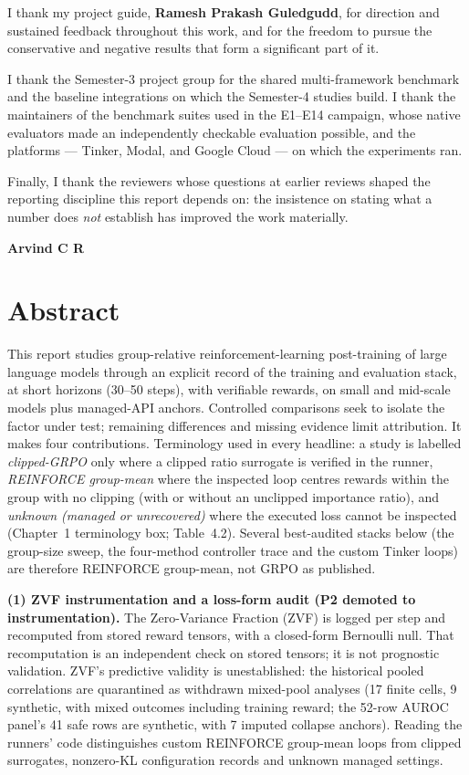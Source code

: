 I thank my project guide, \textbf{Ramesh Prakash Guledgudd}, for direction and
sustained feedback throughout this work, and for the freedom to pursue the
conservative and negative results that form a significant part of it.

I thank the Semester-3 project group for the shared multi-framework benchmark
and the baseline integrations on which the Semester-4 studies build. I thank
the maintainers of the benchmark suites used in the E1--E14 campaign, whose
native evaluators made an independently checkable evaluation possible, and the
platforms --- Tinker, Modal, and Google Cloud --- on which the experiments ran.

Finally, I thank the reviewers whose questions at earlier reviews shaped the
reporting discipline this report depends on: the insistence on stating what a
number does \emph{not} establish has improved the work materially.

\vspace{0.3in}
\noindent\textbf{Arvind C R}

\chapter*{Abstract}
\thispagestyle{plain}

This report studies group-relative reinforcement-learning post-training of
large language models through an explicit record of the training and
evaluation stack, at short horizons (30--50 steps), with verifiable rewards,
on small and mid-scale models plus managed-API anchors. Controlled comparisons seek to isolate the factor under
test; remaining differences and missing evidence limit attribution.
It makes four contributions. Terminology used in every headline: a study is
labelled \emph{clipped-GRPO} only where a clipped ratio surrogate is verified in
the runner, \emph{REINFORCE group-mean} where the inspected loop centres
rewards within the group with no clipping (with or without an unclipped
importance ratio), and \emph{unknown (managed or unrecovered)} where the
executed loss cannot be inspected (Chapter~1 terminology box; Table~4.2).
Several best-audited stacks below (the group-size sweep, the four-method
controller trace and the custom Tinker loops) are therefore REINFORCE
group-mean, not GRPO as published.

\textbf{(1) ZVF instrumentation and a loss-form audit (P2 demoted to
instrumentation).} The Zero-Variance Fraction (ZVF) is logged per step and
recomputed from stored reward tensors, with a closed-form Bernoulli null.
That recomputation is an independent check on stored tensors; it is not
prognostic validation. ZVF's predictive validity is unestablished: the
historical pooled correlations are quarantined as withdrawn mixed-pool
analyses (17 finite cells, 9 synthetic, with mixed outcomes including training
reward; the 52-row AUROC panel's 41 safe rows are synthetic, with 7 imputed
collapse anchors). Reading the runners' code distinguishes custom REINFORCE
group-mean loops from clipped surrogates, nonzero-KL configuration records and
unknown managed settings.

